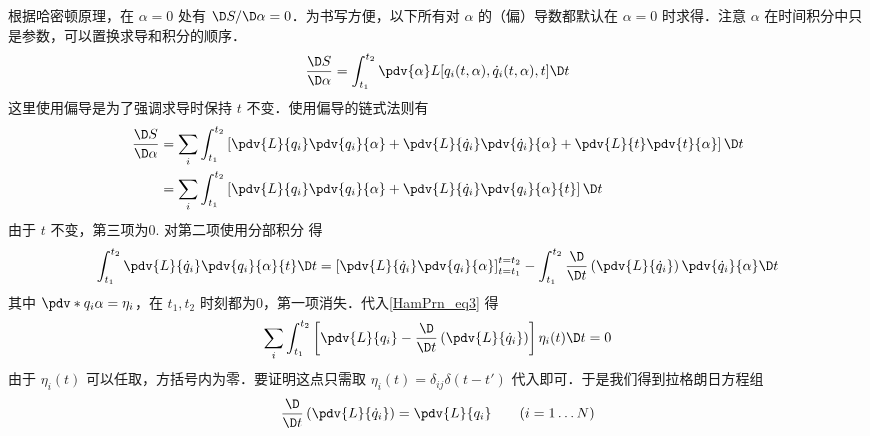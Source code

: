根据哈密顿原理，在 $\alpha = 0$ 处有 $\D S/\D\alpha  = 0$．为书写方便，以下所有对 $\alpha$ 的（偏）导数都默认在 $\alpha=0$ 时求得．注意 $\alpha$ 在时间积分中只是参数，可以置换求导和积分的顺序．
\begin{equation}
\frac{{\D S}}{{\D\alpha }} = \int_{{t_1}}^{{t_2}} {\pdv{\alpha} L[{q_i}(t,\alpha ),{{\dot q}_i}(t,\alpha ),t]\D t}
\end{equation}
这里使用偏导是为了强调求导时保持 $t$ 不变．使用偏导的链式法则有
\begin{equation}\label{HamPrn_eq3}
\begin{aligned}
\frac{{\D S}}{{\D\alpha }} &= \sum\limits_i {\int_{{t_1}}^{{t_2}} {\left[ {\pdv{L}{q_i} \pdv{q_i}{\alpha} + \pdv{L}{\dot q_i} \pdv{\dot q_i}{\alpha} + \pdv{L}{t} \pdv{t}{\alpha}} \right]\D t} } \\
&= \sum\limits_i {\int_{{t_1}}^{{t_2}} {\left[ {\pdv{L}{q_i} \pdv{q_i}{\alpha} + \pdv{L}{\dot q_i}\pdv{q_i}{\alpha}{t}} \right]\D t} } 
\end{aligned}\end{equation}
由于 $t$ 不变，第三项为0. 对第二项使用分部积分 得
\begin{equation}
\int_{{t_1}}^{{t_2}} {\pdv{L}{\dot q_i} \pdv{q_i}{\alpha}{t} \D t}  = \left[ {\pdv{L}{\dot q_i}\pdv{q_i}{\alpha}} \right]_{t = {t_1}}^{t = {t_2}} - \int_{{t_1}}^{{t_2}} {\frac{\D}{{\D t}}\left( {\pdv{L}{\dot q_i}} \right)\pdv{\dot q_i}{\alpha} \D t} 
\end{equation}
其中 $\pdv*{q_i}{\alpha}  = {\eta_i}$，在 $t_1,t_2$ 时刻都为0，第一项消失．代入\autoref{HamPrn_eq3} 得
\begin{equation}
\sum\limits_i {\int_{{t_1}}^{{t_2}} {\left[ {\pdv{L}{q_i} - \frac{\D}{{\D t}}\left( {\pdv{L}{\dot q_i}} \right)} \right]{\eta_i}(t)\D t} }  = 0
\end{equation}
由于 ${\eta_i}(t)$ 可以任取，方括号内为零．要证明这点只需取 ${\eta_i}(t) = {\delta_{ij}}\delta (t - t')$ 代入即可．于是我们得到拉格朗日方程组
\begin{equation}
\frac{\D}{{\D t}}\left( {\pdv{L}{\dot q_i}} \right) = \pdv{L}{q_i}
\qquad
(i = 1\dots N)
\end{equation}